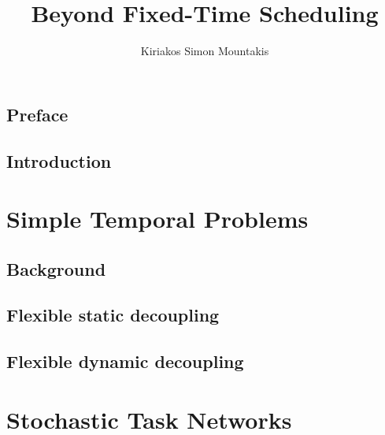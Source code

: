 \documentclass[9pt]{book}
\begin{document}
\title{Beyond Fixed-Time Scheduling}
\author{Kiriakos Simon Mountakis}

\maketitle
\tableofcontents
\listoffigures
\listoftables
\listofalgorithms


\chapter*{Preface}


\chapter{Introduction}
\label{chapter/introduction}


%


\part{Simple Temporal Problems}

\chapter{Background}
\label{chapter/prelim-1}


\chapter{Flexible static decoupling}
\label{chapter/icaps-flexibility}


\chapter{Flexible dynamic decoupling}
\label{chapter/cpaior-decoupling}




\part{Stochastic Task Networks}
\end{document}
